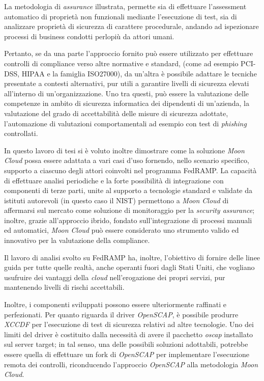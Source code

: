 \documentclass[../main.tex]{subfiles}
\begin{document}
La metodologia di \textit{assurance} illustrata, permette sia di effettuare l'assessment automatico di proprietà non funzionali mediante l'esecuzione di test, sia di analizzare proprietà di sicurezza di carattere procedurale, andando ad ispezionare processi di business condotti perlopiù da attori umani.

Pertanto, se da una parte l'approccio fornito può essere utilizzato per effettuare controlli di compliance verso altre normative e standard, (come ad esempio PCI-DSS, HIPAA e la famiglia ISO27000), da un'altra è possibile adattare le tecniche presentate a contesti alternativi, pur utili a garantire livelli di sicurezza elevati all'interno di un'organizzazione.
Uno tra questi, può essere la valutazione delle competenze in ambito di sicurezza informatica dei dipendenti di un'azienda, la valutazione del grado di accettabilità delle misure di sicurezza adottate, l'automazione di valutazioni comportamentali ad esempio con test di \textit{phishing} controllati.


In questo lavoro di tesi si è voluto inoltre dimostrare come la soluzione \textit{Moon Cloud} possa essere adattata a vari casi d'uso fornendo, nello scenario specifico, supporto a ciascuno degli attori coinvolti nel programma FedRAMP.
La capacità di effettuare analisi periodiche e la forte possibilità di integrazione con componenti di terze parti, unite al supporto a tecnologie standard e validate da istituti autorevoli (in questo caso il NIST) permettono a \textit{Moon Cloud} di affermarsi sul mercato come soluzione di monitoraggio per la \textit{security assurance}; inoltre, grazie all'approccio ibrido, fondato sull'integrazione di processi manuali ed automatici, \textit{Moon Cloud} può essere considerato uno strumento valido ed innovativo per la valutazione della compliance.

Il lavoro di analisi svolto su FedRAMP ha, inoltre, l'obiettivo di fornire delle linee guida per tutte quelle realtà, anche operanti fuori dagli Stati Uniti, che vogliano usufruire dei vantaggi della \textit{cloud} nell'erogazione dei propri servizi, pur mantenendo livelli di rischi accettabili. 

Inoltre, i componenti sviluppati possono essere ulteriormente raffinati e perfezionati.
Per quanto riguarda il driver \textit{OpenSCAP}, è possibile produrre \textit{XCCDF} per l'esecuzione di test di sicurezza relativi ad altre tecnologie.
Uno dei limiti del driver è costituito dalla necessità di avere il pacchetto \textit{oscap} installato sul server target; in tal senso, una delle possibili soluzioni adottabili, potrebbe essere quella di effettuare un fork di \textit{OpenSCAP} per implementare l'esecuzione remota dei controlli, riconducendo l'approccio \textit{OpenSCAP} alla metodologia \textit{Moon Cloud}.
\end{document}
